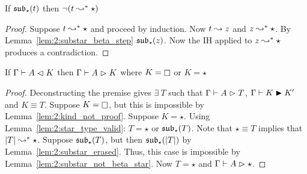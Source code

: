 \begin{lemma}
    If $\mathfrak{sub}_\star(t)$ then $\neg (t \leadsto^* \star)$
    \label{lem:2:substar_not_beta_star}
\end{lemma}
\begin{proof}
    Suppose $t \leadsto^* \star$ and proceed by induction.
    Now $t \leadsto z$ and $z \leadsto^* \star$.
    By Lemma~\ref{lem:2:substar_beta_step} $\mathfrak{sub}_\star(z)$.
    Now the IH applied to $z \leadsto^* \star$ produces a contradiction.
\end{proof}

\begin{lemma}
    If $\Gamma \vdash A \vartriangleleft K$ then $\Gamma \vdash A \vartriangleright K$ where $K = \kind$ or $K = \star$
    \label{lem:2:check_k_is_infer_k}
\end{lemma}
\begin{proof}
    Deconstructing the premise gives $\exists\ T$ such that $\Gamma \vdash A \vartriangleright T$, $\Gamma \vdash K \blacktriangleright K^\prime$ and $K \equiv T$.
    Suppose $K = \kind$, but this is impossible by Lemma~\ref{lem:2:kind_not_proof}.
    Suppose $K = \star$.
    Using Lemma~\ref{lem:2:star_type_valid}: $T = \star$ or $\mathfrak{sub}_\star(T)$.
    Note that $\star \equiv T$ implies that $|T| \leadsto^* \star$.
    Suppose $\mathfrak{sub}_\star(T)$, but then $\mathfrak{sub}_\star(|T|)$ by Lemma~\ref{lem:2:substar_erased}.
    Thus, this case is impossible by Lemma~\ref{lem:2:substar_not_beta_star}.
    Now $T = \star$ and $\Gamma \vdash A \vartriangleright \star$.
\end{proof}
